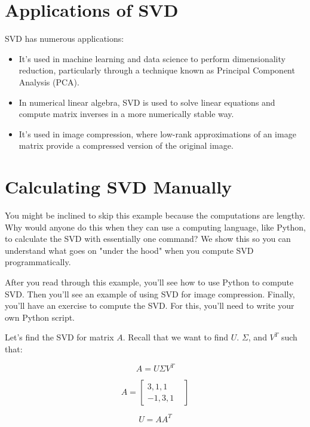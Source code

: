 \section{Applications of SVD}

SVD has numerous applications:

\begin{itemize}
\item It's used in machine learning and data science to perform
  dimensionality reduction, particularly through a technique known as
  Principal Component Analysis (PCA).

\item In numerical linear algebra, SVD is used to solve linear
  equations and compute matrix inverses in a more numerically stable
  way.

\item It's used in image compression, where low-rank approximations of
  an image matrix provide a compressed version of the original image.
\end{itemize}

\section{Calculating SVD Manually}
You might be inclined to skip this example because the computations are lengthy. Why would anyone do this when they can use a computing language, like Python, to calculate the SVD with essentially one command? We show this so you can understand what goes on "under the hood" when you compute SVD programmatically. 

After you read through this example, you'll see how to use Python to compute SVD. Then you'll see an example of using SVD for image compression. Finally, you'll have an exercise to compute the SVD. For this, you'll need to write your own Python script.

Let's find the SVD for matrix $A$. Recall that we want to find $U$. $\Sigma$, and $V^T$ such that:

\begin{equation}
A = U \Sigma V^T
\end{equation}

$$ A = \begin{bmatrix}
3,1,1 &  \\
 -1, 3,1& 
\end{bmatrix}$$

$$U = AA^T$$ 

